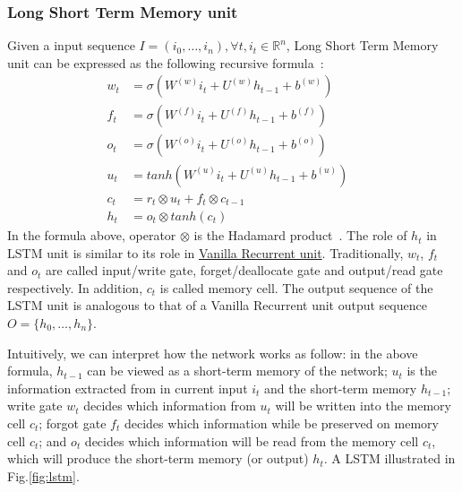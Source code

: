 \subsubsection{Long Short Term Memory unit}\label{sec:lstm}
Given a input sequence \(I = (i_0,\ldots,i_n), \forall t, i_t \in \mathbb{R}^n\), Long Short Term Memory unit can be expressed as the following recursive formula~\cite{treeLSTM}:
\begin{align}
    w_t &= \sigma(W^{(w)}i_t + U^{(w)}h_{t-1} + b^{(w)}) \label{eq:lstm-input-gate}&\\
      f_t &= \sigma(W^{(f)}i_t + U^{(f)}h_{t-1} + b^{(f)}) \label{eq:lstm-forget-gate}&\\
      o_t &= \sigma(W^{(o)}i_t + U^{(o)}h_{t-1} + b^{(o)}) \label{eq:lstm-output-gate}&\\
      u_t &= tanh(W^{(u)}i_t + U^{(u)}h_{t-1} + b^{(u)}) \label{eq:lstm-update-gate}&\\
      c_t &= r_t \otimes u_t + f_t \otimes c_{t-1} \label{eq:longterm-mem}&\\
      h_t &= o_t \otimes tanh(c_t) \label{eq:temperal-mem}&
\end{align}
In the formula above, operator \(\otimes\) is the Hadamard product~\cite{element-prod}.
The role of \(h_t\) in LSTM unit is similar to its role in \hyperref[sec:vanilla-rnn]{Vanilla Recurrent unit}.
Traditionally, \(w_t\), \(f_t\) and \(o_t\) are called input/write gate, forget/deallocate gate and output/read gate respectively.
In addition, \(c_t\) is called memory cell.
The output sequence of the LSTM unit is analogous to that of a Vanilla Recurrent unit output sequence \(O = \{h_0,\ldots,h_n\}\).

Intuitively, we can interpret how the network works as follow: in the above formula, \(h_{t-1}\) can be viewed as a short-term memory of the network; \(u_t\) is the information extracted from in current input \(i_t\) and the short-term memory \(h_{t-1}\); write gate \(w_t\) decides which information from \(u_t\) will be written into the memory cell \(c_t\); forgot gate \(f_t\) decides which information while be preserved on memory cell \(c_t\); and \(o_t\) decides which information will be read from the memory cell \(c_t\), which will produce the short-term memory (or output) \(h_t\).
A LSTM illustrated in Fig.\ref{fig:lstm}.


